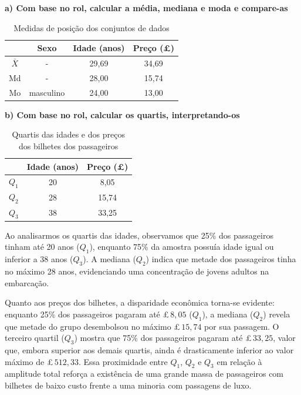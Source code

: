 \documentclass[brazil, a4paper, 11pt]{article}
\begin{document}
	\noindent\textbf{a) Com base no rol, calcular a média, mediana e moda e compare-as}
	\begin{table}[H]
		\centering
		\caption{Medidas de posição dos conjuntos de dados}
		\begin{tabular}{c|ccc}
			\toprule
						& Sexo		& Idade (anos)	& Preço (\pounds)	\\
			\midrule
			$\bar{X}$	& -			& 29,69			& 34,69 			\\
			Md			& -			& 28,00			& 15,74 			\\
			Mo			& masculino	& 24,00			& 13,00				\\
			\bottomrule
		\end{tabular}
	\end{table}

	\noindent\textbf{b) Com base no rol, calcular os quartis, interpretando-os}

	\begin{table}[H]
		\centering
		\caption{Quartis das idades e dos preços dos bilhetes dos passageiros\footnotemark}
		\begin{tabular}{c|cc}
			\toprule
					& Idade (anos)	& Preço (\pounds)	\\
			\midrule
			$Q_1$	& 20			& 8,05 				\\
			$Q_2$	& 28			& 15,74 			\\
			$Q_3$	& 38			& 33,25				\\
			\bottomrule
		\end{tabular}
	\end{table}
	Ao analisarmos os quartis das idades, observamos que 25\% dos passageiros tinham até 20 anos ($Q_1$), enquanto 75\% da amostra possuía idade igual ou inferior a 38 anos ($Q_3$). A mediana ($Q_2$) indica que metade dos passageiros tinha no máximo 28 anos, evidenciando uma concentração de jovens adultos na embarcação.

	Quanto aos preços dos bilhetes, a disparidade econômica torna-se evidente: enquanto 25\% dos passageiros pagaram até \pounds\,$8,05$ ($Q_1$), a mediana ($Q_2$) revela que metade do grupo desembolsou no máximo \pounds\,$15,74$ por sua passagem. O terceiro quartil ($Q_3$) mostra que 75\% dos passageiros pagaram até \pounds\,$33,25$, valor que, embora superior aos demais quartis, ainda é drasticamente inferior ao valor máximo de \pounds\,$512,33$. Essa proximidade entre $Q_1$, $Q_2$ e $Q_3$ em relação à amplitude total reforça a existência de uma grande massa de passageiros com bilhetes de baixo custo frente a uma minoria com passagens de luxo.
	\vspace*{2\baselineskip}
	
\end{document}
